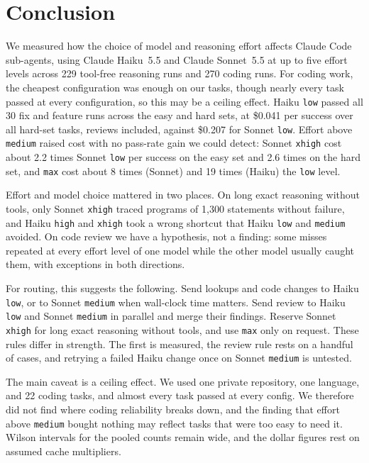 \section{Conclusion}\label{sec:conclusion}

We measured how the choice of model and reasoning effort affects Claude Code sub-agents, using Claude Haiku~5.5 and Claude Sonnet~5.5 at up to five effort levels across 229 tool-free reasoning runs and 270 coding runs. For coding work, the cheapest configuration was enough on our tasks, though nearly every task passed at every configuration, so this may be a ceiling effect. Haiku \texttt{low} passed all 30 fix and feature runs across the easy and hard sets, at \$0.041 per success over all hard-set tasks, reviews included, against \$0.207 for Sonnet \texttt{low}. Effort above \texttt{medium} raised cost with no pass-rate gain we could detect: Sonnet \texttt{xhigh} cost about 2.2 times Sonnet \texttt{low} per success on the easy set and 2.6 times on the hard set, and \texttt{max} cost about 8 times (Sonnet) and 19 times (Haiku) the \texttt{low} level.

Effort and model choice mattered in two places. On long exact reasoning without tools, only Sonnet \texttt{xhigh} traced programs of 1,300 statements without failure, and Haiku \texttt{high} and \texttt{xhigh} took a wrong shortcut that Haiku \texttt{low} and \texttt{medium} avoided. On code review we have a hypothesis, not a finding: some misses repeated at every effort level of one model while the other model usually caught them, with exceptions in both directions.

For routing, this suggests the following. Send lookups and code changes to Haiku \texttt{low}, or to Sonnet \texttt{medium} when wall-clock time matters. Send review to Haiku \texttt{low} and Sonnet \texttt{medium} in parallel and merge their findings. Reserve Sonnet \texttt{xhigh} for long exact reasoning without tools, and use \texttt{max} only on request. These rules differ in strength. The first is measured, the review rule rests on a handful of cases, and retrying a failed Haiku change once on Sonnet \texttt{medium} is untested.

The main caveat is a ceiling effect. We used one private repository, one language, and 22 coding tasks, and almost every task passed at every config. We therefore did not find where coding reliability breaks down, and the finding that effort above \texttt{medium} bought nothing may reflect tasks that were too easy to need it. Wilson intervals for the pooled counts remain wide, and the dollar figures rest on assumed cache multipliers.

